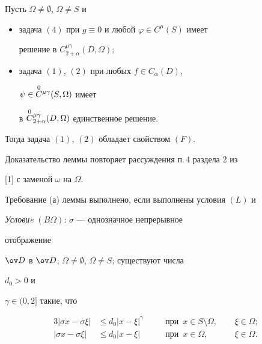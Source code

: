 \begin{lemnonum} 


Пусть $\Omega\ne\emptyset$, $\Omega\ne S$ и 


\begin{itemize} 


\item[(а)] задача $(4)$ при $g\equiv0$ и любой $\varphi\in C^\mu(S)$ имеет 


решение в $C^{\mu\gamma}_{2+\alpha}(D,\Omega);$ 


\item[(б)] задача $(1)$, $(2)$ при любых $f\in C_\alpha(D)$, 


$\psi\in\overset{0}{C}{}^{\mu\gamma}(S,\Omega)$ имеет 


в $\overset{0}{C}{}^{\mu\gamma}_{2+\alpha}(D,\Omega)$ единственное решение.


\end{itemize} 


 


Тогда задача $(1)$, $(2)$ обладает свойством $(F)$. 


\end{lemnonum} 


 


Доказательство леммы повторяет рассуждения п.\,4 раздела 2 из 


[1] с заменой $\omega$ на $\Omega$. 


 


Требование (а) леммы выполнено, если выполнены условия $(L)$ и 


\medskip 


 


{\it Условиe} $(B\Omega)$: $\sigma$ --- однозначное непрерывное 


отображение 


$\ov D$ в $\ov D$; $\Omega\ne\emptyset$, $\Omega\ne S$; существуют числа 


$d_0>0$ и 


$\gamma\in(0,2]$ такие, что 


\begin{alignat*}{3} 


|\sigma x-\sigma\xi|&\le d_0|x-\xi|^\gamma &\quad 


&\text{при}\ \; x\in S\setminus\Omega, &\ \ &\xi\in\Omega; \\ 


%


|\sigma x-\sigma\xi|&\le d_0|x-\xi| &\quad 


&\text{при}\ \; x\in\Omega, &\ \ &\xi\in\Omega. 


\end{alignat*} 


